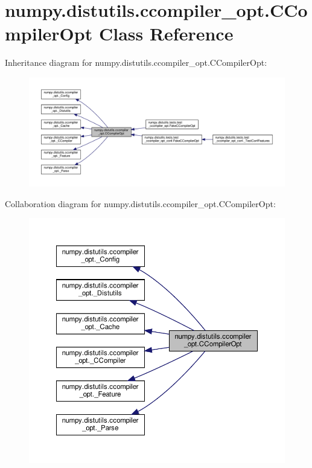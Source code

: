 \hypertarget{classnumpy_1_1distutils_1_1ccompiler__opt_1_1CCompilerOpt}{}\section{numpy.\+distutils.\+ccompiler\+\_\+opt.\+C\+Compiler\+Opt Class Reference}
\label{classnumpy_1_1distutils_1_1ccompiler__opt_1_1CCompilerOpt}


Inheritance diagram for numpy.\+distutils.\+ccompiler\+\_\+opt.\+C\+Compiler\+Opt\+:
\nopagebreak
\begin{figure}[H]
\begin{center}
\leavevmode
\includegraphics[width=350pt]{classnumpy_1_1distutils_1_1ccompiler__opt_1_1CCompilerOpt__inherit__graph}
\end{center}
\end{figure}


Collaboration diagram for numpy.\+distutils.\+ccompiler\+\_\+opt.\+C\+Compiler\+Opt\+:
\nopagebreak
\begin{figure}[H]
\begin{center}
\leavevmode
\includegraphics[width=350pt]{classnumpy_1_1distutils_1_1ccompiler__opt_1_1CCompilerOpt__coll__graph}
\end{center}
\end{figure}
